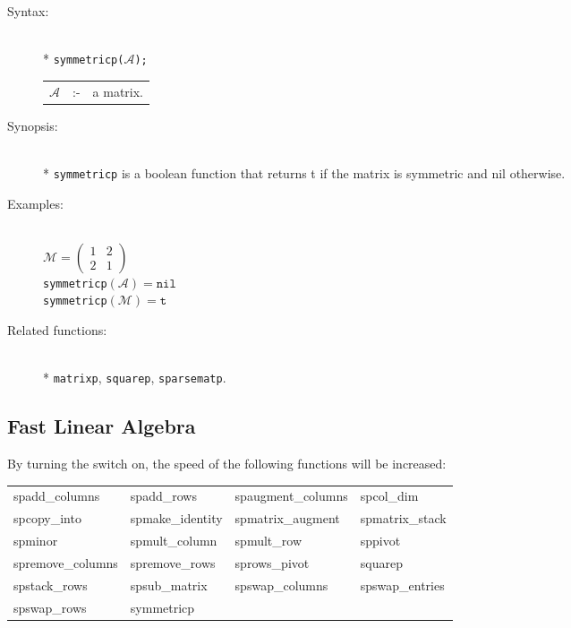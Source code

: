 \begin{description}
\item[Syntax:]\mbox{}\\*
\texttt{symmetricp($\mathcal{A}$);}\\[2mm]
\begin{tabular}{l l l}
$\mathcal{A}$ &:-& a matrix.
\end{tabular}

\item[Synopsis:]\mbox{}\\*
\texttt{symmetricp} is a boolean function that returns t if the
                matrix is symmetric and nil otherwise.

\item[Examples:]\mbox{}\\
\(\mathcal{M} = \begin{pmatrix} 1 & 2 \\ 2 & 1 \end{pmatrix}\) \\[2mm]
\texttt{symmetricp}\((\mathcal{A}) = \texttt{nil}\) \\[2mm]
\texttt{symmetricp}\((\mathcal{M}) = \texttt{t}\)

\item[Related functions:]\mbox{}\\*
\texttt{matrixp}, \texttt{squarep}, \texttt{sparsematp}.
\end{description}


\subsection{Fast Linear Algebra}

By turning the  switch on, the speed of the following
functions will be increased:

\begin{tabular}{l l l l}
spadd\_columns    & spadd\_rows      & spaugment\_columns & spcol\_dim  \\
spcopy\_into      & spmake\_identity & spmatrix\_augment  & spmatrix\_stack\\
spminor           & spmult\_column   &  spmult\_row       & sppivot        \\
spremove\_columns & spremove\_rows   & sprows\_pivot      & squarep      \\
spstack\_rows     & spsub\_matrix    & spswap\_columns    & spswap\_entries\\
spswap\_rows      & symmetricp
\end{tabular}

